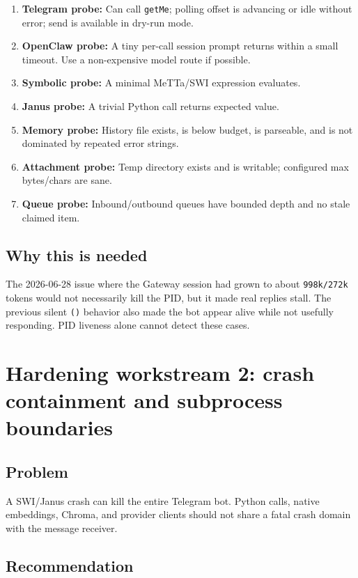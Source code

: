 \documentclass[11pt]{article}
\begin{document}
\begin{enumerate}
  \item \textbf{Telegram probe:} Can call \texttt{getMe}; polling offset is advancing or idle without error; send is available in dry-run mode.
  \item \textbf{OpenClaw probe:} A tiny per-call session prompt returns within a small timeout. Use a non-expensive model route if possible.
  \item \textbf{Symbolic probe:} A minimal MeTTa/SWI expression evaluates.
  \item \textbf{Janus probe:} A trivial Python call returns expected value.
  \item \textbf{Memory probe:} History file exists, is below budget, is parseable, and is not dominated by repeated error strings.
  \item \textbf{Attachment probe:} Temp directory exists and is writable; configured max bytes/chars are sane.
  \item \textbf{Queue probe:} Inbound/outbound queues have bounded depth and no stale claimed item.
\end{enumerate}

\subsection{Why this is needed}

The 2026-06-28 issue where the Gateway session had grown to about \texttt{998k/272k} tokens would not necessarily kill the PID, but it made real replies stall. The previous silent \texttt{()} behavior also made the bot appear alive while not usefully responding. PID liveness alone cannot detect these cases.

\section{Hardening workstream 2: crash containment and subprocess boundaries}

\subsection{Problem}

A SWI/Janus crash can kill the entire Telegram bot. Python calls, native embeddings, Chroma, and provider clients should not share a fatal crash domain with the message receiver.

\subsection{Recommendation}
\end{document}
